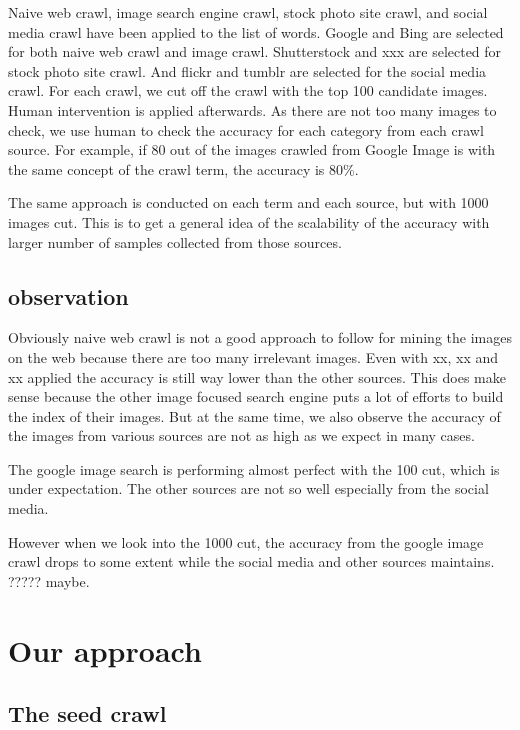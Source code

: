 \documentclass[paper=a4, fontsize=11pt]{scrartcl}
\numberwithin{equation}{section}		%
\numberwithin{figure}{section}			%
\numberwithin{table}{section}				%
\begin{document}
\begin{multicols}{2}
Naive web crawl, image search engine crawl, stock photo site crawl, and social media crawl have been applied to the list of words. Google and Bing are selected for both naive web crawl and image crawl. Shutterstock and xxx are selected for stock photo site crawl. And flickr and tumblr are selected for the social media crawl. For each crawl, we cut off the crawl with the top 100 candidate images. Human intervention is applied afterwards. As there are not too many images to check, we use human to check the accuracy for each category from each crawl source. For example, if 80 out of the images crawled from Google Image is with the same concept of the crawl term, the accuracy is 80\%.

\noindent The same approach is conducted on each term and each source, but with 1000 images cut. This is to get a general idea of the scalability of the accuracy with larger number of samples collected from those sources.

\subsection{observation}

Obviously naive web crawl is not a good approach to follow for mining the images on the web because there are too many irrelevant images. Even with xx, xx and xx applied the accuracy is still way lower than the other sources. This does make sense because the other image focused search engine puts a lot of efforts to build the index of their images. But at the same time, we also observe the accuracy of the images from various sources are not as high as we expect in many cases.

\noindent The google image search is performing almost perfect with the 100 cut, which is under expectation. The other sources are not so well especially from the social media.

\noindent However when we look into the 1000 cut, the accuracy from the google image crawl drops to some extent while the social media and other sources maintains. ????? maybe.

\section{Our approach}

\subsection{The seed crawl}


\end{multicols}
\end{document}
